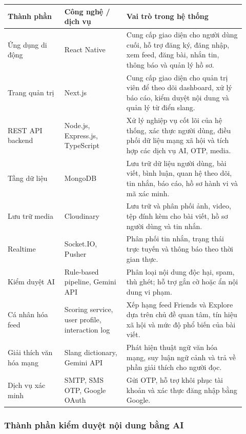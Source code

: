 {\def\LTcaptype{none}
\begin{longtable}{
  |>{\raggedright\arraybackslash}p{0.22\linewidth}
  |>{\raggedright\arraybackslash}p{0.24\linewidth}
  |>{\raggedright\arraybackslash}p{0.46\linewidth}|}
\hline
\textbf{Thành phần} & \textbf{Công nghệ / dịch vụ} & \textbf{Vai trò trong hệ thống} \\ \hline
\endhead
\hline
\endlastfoot
Ứng dụng di động & React Native & Cung cấp giao diện cho người dùng cuối, hỗ trợ đăng ký, đăng nhập, xem feed, đăng bài, nhắn tin, thông báo và quản lý hồ sơ. \\ \hline
Trang quản trị & Next.js & Cung cấp giao diện cho quản trị viên để theo dõi dashboard, xử lý báo cáo, kiểm duyệt nội dung và quản lý từ điển slang. \\ \hline
REST API backend & Node.js, Express.js, TypeScript & Xử lý nghiệp vụ cốt lõi của hệ thống, xác thực người dùng, điều phối dữ liệu mạng xã hội và tích hợp các dịch vụ AI, OTP, media. \\ \hline
Tầng dữ liệu & MongoDB & Lưu trữ dữ liệu người dùng, bài viết, bình luận, quan hệ theo dõi, tin nhắn, báo cáo, hồ sơ hành vi và mã xác minh. \\ \hline
Lưu trữ media & Cloudinary & Lưu trữ và phân phối ảnh, video, tệp đính kèm cho bài viết, hồ sơ người dùng và tin nhắn. \\ \hline
Realtime & Socket.IO, Pusher & Phân phối tin nhắn, trạng thái trực tuyến và thông báo theo thời gian thực. \\ \hline
Kiểm duyệt AI & Rule-based pipeline, Gemini API & Phân loại nội dung độc hại, spam, thù ghét; hỗ trợ gắn cờ hoặc ẩn nội dung vi phạm. \\ \hline
Cá nhân hóa feed & Scoring service, user profile, interaction log & Xếp hạng feed Friends và Explore dựa trên chủ đề quan tâm, tín hiệu xã hội và mức độ phổ biến của bài viết. \\ \hline
Giải thích văn hóa mạng & Slang dictionary, Gemini API & Phát hiện thuật ngữ văn hóa mạng, suy luận ngữ cảnh và trả về phần giải thích cho người đọc. \\ \hline
Dịch vụ xác minh & SMTP, SMS OTP, Google OAuth & Gửi OTP, hỗ trợ khôi phục tài khoản và xác thực đăng nhập bằng Google. \\ \hline
\end{longtable}
}

\subsubsection{Thành phần kiểm duyệt nội dung bằng AI}

